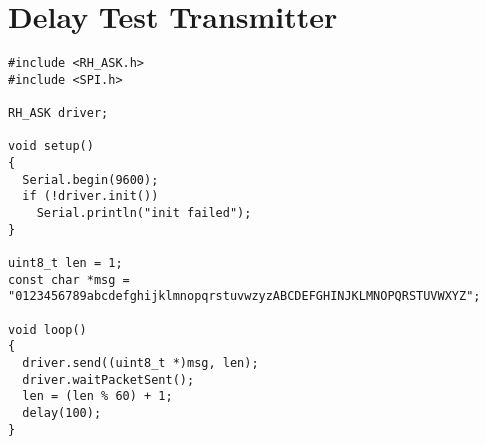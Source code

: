 \chapter{Delay Test Transmitter}\label{app:t2transmitter}

\begin{lstlisting}[style=customc]
#include <RH_ASK.h>
#include <SPI.h> 

RH_ASK driver;

void setup()
{
  Serial.begin(9600);
  if (!driver.init())
    Serial.println("init failed");
}

uint8_t len = 1;
const char *msg = "0123456789abcdefghijklmnopqrstuvwzyzABCDEFGHINJKLMNOPQRSTUVWXYZ";

void loop()
{
  driver.send((uint8_t *)msg, len);
  driver.waitPacketSent();
  len = (len % 60) + 1;
  delay(100);
}
\end{lstlisting}